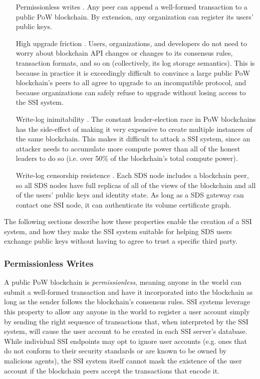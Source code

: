 \begin{enumerate}
   \item[Permissionless writes].  Any peer can append a well-formed transaction 
      to a public PoW blockchain.  By extension, any organization can register
      its users' public keys.
   \item[High upgrade friction].  Users, organizations, and developers do not
      need to worry about blockchain API changes or changes to its consensus
      rules, transaction formats, and so on (collectively, its log storage
      semantics).  This is because in practice it is exceedingly difficult to
      convince a large public PoW blockchain's peers to all agree to upgrade to an
      incompatible protocol, and because organizations can safely refuse to
      upgrade without losing access to the SSI system.
   \item[Write-log inimitability].  The constant leader-election race in PoW
      blockchains has the side-effect of making it very expensive to create
      multiple instances of the same blockchain.  This makes it difficult to
      attack a SSI system, since an attacker needs to accumulate more compute
      power than all of the honest leaders to do so (i.e. over 50\% of the blockchain's
      total compute power).
   \item[Write-log censorship resistence].  Each SDS node includes a blockchain
      peer, so all SDS nodes have full replicas of all of the views of the
      blockchain and all of the users' public keys and identity state.
      As long as a SDS gateway can contact one SSI node, it can authenticate its volume
      certificate graph.
\end{enumerate}

The following sections describe how these properties enable the creation of a
SSI system, and how they make the SSI system suitable for helping SDS users
exchange public keys without having to agree to trust a specific third party.

\subsubsection{Permissionless Writes}

A public PoW blockchain is \emph{permissionless}, meaning anyone in the world can submit a
well-formed transaction and have it incorporated into the blockchain as
long as the sender follows the blockchain's consensus rules.
SSI systems leverage this property to allow any anyone in the world to register a user account
simply by sending the right sequence of transactions that, when interpreted by the SSI system, will
cause the user account to be created in each SSI server's database.
While individual SSI endpoints may opt to ignore user accounts (e.g. ones that do not conform to their security
standards or are known to be owned by malicious agents), the SSI system itself cannot
mask the existence of the user account if the blockchain peers accept the
transactions that encode it.

